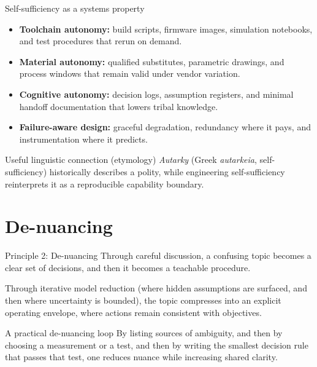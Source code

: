 \documentclass[presentation,aspectratio=169,11pt]{beamer}
\newcommand{\KeyTerm}[1]{\textbf{#1}}
\begin{document}
\begin{frame}{Self-sufficiency as a systems property}
\justifying
\begin{itemize}
  \item \KeyTerm{Toolchain autonomy:} build scripts, firmware images, simulation notebooks, and test procedures that rerun on demand.
  \item \KeyTerm{Material autonomy:} qualified substitutes, parametric drawings, and process windows that remain valid under vendor variation.
  \item \KeyTerm{Cognitive autonomy:} decision logs, assumption registers, and minimal handoff documentation that lowers tribal knowledge.
  \item \KeyTerm{Failure-aware design:} graceful degradation, redundancy where it pays, and instrumentation where it predicts.
\end{itemize}

\vspace{0.4em}
\begin{block}{Useful linguistic connection (etymology)}
\justifying
\emph{Autarky} (Greek \emph{autarkeia}, self-sufficiency) historically describes a polity, while engineering self-sufficiency reinterprets it as a reproducible capability boundary.
\end{block}
\end{frame}

\section{De-nuancing}

\begin{frame}{Principle 2: De-nuancing}
\justifying
Through careful discussion, a confusing topic becomes a clear set of decisions, and then it becomes a teachable procedure.

\vspace{0.6em}
Through iterative model reduction (where hidden assumptions are surfaced, and then where uncertainty is bounded), the topic compresses into an explicit operating envelope, where actions remain consistent with objectives.

\vspace{0.8em}
\begin{block}{A practical de-nuancing loop}
\justifying
By listing sources of ambiguity, and then by choosing a measurement or a test, and then by writing the smallest decision rule that passes that test, one reduces nuance while increasing shared clarity.
\end{block}
\end{frame}
\end{document}
